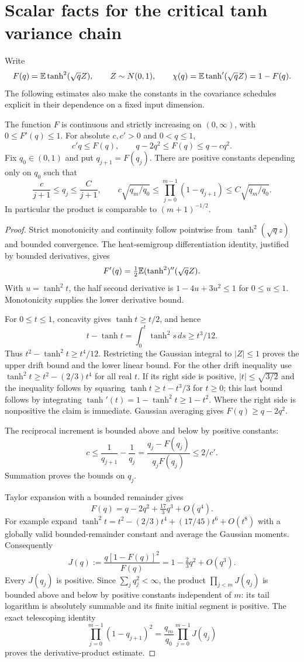 \section{Scalar facts for the critical tanh variance chain}
\label{sec:echo-scalar-preliminaries}
Write
\[
 F(q)=\mathbb E\tanh^2(\sqrt q Z),\qquad Z\sim N(0,1),\qquad
 \chi(q)=\mathbb E\tanh'(\sqrt q Z)=1-F(q).
\]
The following estimates also make the constants in the covariance schedules explicit in their dependence on a fixed input dimension.

\begin{lemma}
\label{lem:echo-scalar-facts}
The function $F$ is continuous and strictly increasing on $(0,\infty)$, with $0\le F'(q)\le1$. For absolute $c,c'>0$ and $0<q\le1$,
\[
 c'q\le F(q),\qquad q-2q^2\le F(q)\le q-cq^2.
\]
Fix $q_0\in(0,1)$ and put $q_{j+1}=F(q_j)$. There are positive constants depending only on $q_0$ such that
\[
 \frac c{j+1}\le q_j\le\frac C{j+1},\qquad
 c\sqrt{q_m/q_0}\le\prod_{j=0}^{m-1}(1-q_{j+1})
                \le C\sqrt{q_m/q_0}.
\]
In particular the product is comparable to $(m+1)^{-1/2}$.
\end{lemma}
\begin{proof}
Strict monotonicity and continuity follow pointwise from $\tanh^2(\sqrt q z)$ and bounded convergence. The heat-semigroup differentiation identity, justified by bounded derivatives, gives
\[
 F'(q)=\tfrac12\mathbb E(\tanh^2)''(\sqrt q Z).
\]
With $u=\tanh^2 t$, the half second derivative is $1-4u+3u^2\le1$ for $0\le u\le1$. Monotonicity supplies the lower derivative bound.

For $0\le t\le1$, concavity gives $\tanh t\ge t/2$, and hence
\[
 t-\tanh t=\int_0^t\tanh^2 s\,ds\ge t^3/12.
\]
Thus $t^2-\tanh^2t\ge t^4/12$. Restricting the Gaussian integral to $|Z|\le1$ proves the upper drift bound and the lower linear bound. For the other drift inequality use
$\tanh^2t\ge t^2-(2/3)t^4$ for all real $t$. If its right side is positive, $|t|\le\sqrt{3/2}$ and the inequality follows by squaring $\tanh t\ge t-t^3/3$ for $t\ge0$; this last bound follows by integrating $\tanh'(t)=1-\tanh^2t\ge1-t^2$. Where the right side is nonpositive the claim is immediate. Gaussian averaging gives $F(q)\ge q-2q^2$.

The reciprocal increment is bounded above and below by positive constants:
\[
 c\le\frac1{q_{j+1}}-\frac1{q_j}
 =\frac{q_j-F(q_j)}{q_jF(q_j)}\le2/c'.
\]
Summation proves the bounds on $q_j$.

Taylor expansion with a bounded remainder gives
\[
 F(q)=q-2q^2+\tfrac{17}{3}q^3+O(q^4).
\]
For example expand $\tanh^2t=t^2-(2/3)t^4+(17/45)t^6+O(t^8)$ with a globally valid bounded-remainder constant and average the Gaussian moments. Consequently
\[
 J(q):=\frac{q[1-F(q)]^2}{F(q)}
       =1-\tfrac23q^2+O(q^3).
\]
Every $J(q_j)$ is positive. Since $\sum_jq_j^2<\infty$, the product $\prod_{j<m}J(q_j)$ is bounded above and below by positive constants independent of $m$: its tail logarithm is absolutely summable and its finite initial segment is positive. The exact telescoping identity
\[
 \prod_{j=0}^{m-1}(1-q_{j+1})^2
   =\frac{q_m}{q_0}\prod_{j=0}^{m-1}J(q_j)
\]
proves the derivative-product estimate.
\end{proof}
